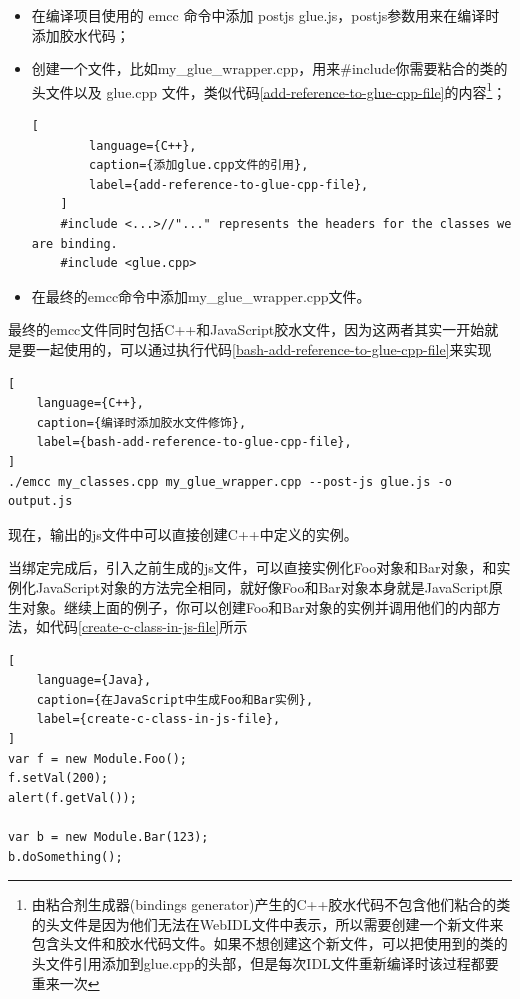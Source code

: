 \begin{itemize}[itemindent=2em]
    \item 在编译项目使用的 emcc 命令中添加 \text{--}post\text{-}js glue.js，post\text{-}js参数用来在编译时添加胶水代码；
    \item 创建一个文件，比如my\_glue\_wrapper.cpp，用来\#include你需要粘合的类的头文件以及 glue.cpp 文件，类似代码\ref{add-reference-to-glue-cpp-file}的内容\footnote{由粘合剂生成器(bindings generator)产生的C++胶水代码不包含他们粘合的类的头文件是因为他们无法在WebIDL文件中表示，所以需要创建一个新文件来包含头文件和胶水代码文件。如果不想创建这个新文件，可以把使用到的类的头文件引用添加到glue.cpp的头部，但是每次IDL文件重新编译时该过程都要重来一次}；

    \begin{lstlisting}[
        language={C++},
        caption={添加glue.cpp文件的引用},
        label={add-reference-to-glue-cpp-file},
    ]
    #include <...>//"..." represents the headers for the classes we are binding.
    #include <glue.cpp>
    \end{lstlisting}

    \item 在最终的emcc命令中添加my\_glue\_wrapper.cpp文件。

\end{itemize}

最终的emcc文件同时包括C++和JavaScript胶水文件，因为这两者其实一开始就是要一起使用的，可以通过执行代码\ref{bash-add-reference-to-glue-cpp-file}来实现
\begin{lstlisting}[
    language={C++},
    caption={编译时添加胶水文件修饰},
    label={bash-add-reference-to-glue-cpp-file},
]
./emcc my_classes.cpp my_glue_wrapper.cpp --post-js glue.js -o output.js
\end{lstlisting}

现在，输出的js文件中可以直接创建C++中定义的实例。

当绑定完成后，引入之前生成的js文件，可以直接实例化Foo对象和Bar对象，和实例化JavaScript对象的方法完全相同，就好像Foo和Bar对象本身就是JavaScript原生对象。继续上面的例子，你可以创建Foo和Bar对象的实例并调用他们的内部方法，如代码\ref{create-c-class-in-js-file}所示


\begin{lstlisting}[
    language={Java},
    caption={在JavaScript中生成Foo和Bar实例},
    label={create-c-class-in-js-file},
]
var f = new Module.Foo();
f.setVal(200);
alert(f.getVal());

var b = new Module.Bar(123);
b.doSomething();
\end{lstlisting}

